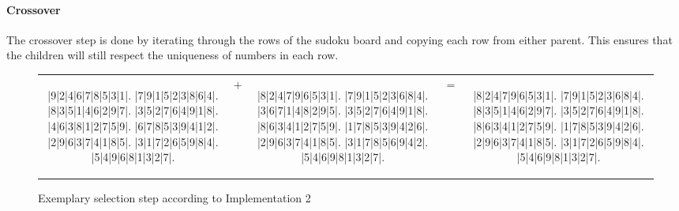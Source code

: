 \paragraph{Crossover} The crossover step is done by iterating through the rows of the sudoku board and copying each row from either parent. This ensures that the children will still respect the uniqueness of numbers in each row.

\begin{figure}[H]
  \centering
  {\setlength{\tabcolsep}{-9pt}
  \renewcommand{\arraystretch}{1.5}
   \begin{tabular}{c c c c c}
    \begin{adjustbox}{width=0.38\textwidth,valign=c}
      \begin{minipage}{\linewidth}
        \begin{sudoku}
          |9|2|4|6|7|8|5|3|1|.
          |7|9|1|5|2|3|8|6|4|.
          |8|3|5|1|4|6|2|9|7|.
          |3|5|2|7|6|4|9|1|8|.
          |4|6|3|8|1|2|7|5|9|.
          |6|7|8|5|3|9|4|1|2|.
          |2|9|6|3|7|4|1|8|5|.
          |3|1|7|2|6|5|9|8|4|.
          |5|4|9|6|8|1|3|2|7|.
        \end{sudoku}
      \end{minipage}
    \end{adjustbox}
    & %
    {\begin{adjustbox}{valign=c}\Large$+$\end{adjustbox}}
    &
    \begin{adjustbox}{width=0.38\textwidth,valign=c}
      \begin{minipage}{\linewidth}
        \begin{sudoku}
          |8|2|4|7|9|6|5|3|1|.
          |7|9|1|5|2|3|6|8|4|.
          |3|6|7|1|4|8|2|9|5|.
          |3|5|2|7|6|4|9|1|8|.
          |8|6|3|4|1|2|7|5|9|.
          |1|7|8|5|3|9|4|2|6|.
          |2|9|6|3|7|4|1|8|5|.
          |3|1|7|8|5|6|9|4|2|.
          |5|4|6|9|8|1|3|2|7|.
        \end{sudoku}
      \end{minipage}
    \end{adjustbox}
    & %
    {\begin{adjustbox}{valign=c}\Large$=$\end{adjustbox}}
    &
    \begin{adjustbox}{width=0.38\textwidth,valign=c}
      \begin{minipage}{\linewidth}
        \begin{sudoku}
          |8|2|4|7|9|6|5|3|1|.
          |7|9|1|5|2|3|6|8|4|.
          |8|3|5|1|4|6|2|9|7|.
          |3|5|2|7|6|4|9|1|8|.
          |8|6|3|4|1|2|7|5|9|.
          |1|7|8|5|3|9|4|2|6|.
          |2|9|6|3|7|4|1|8|5|.
          |3|1|7|2|6|5|9|8|4|.
          |5|4|6|9|8|1|3|2|7|.
        \end{sudoku}
      \end{minipage}
    \end{adjustbox}
   \end{tabular}
  }
  \caption{Exemplary selection step according to Implementation 2}
  \label{fig:impl-2-selection}
\end{figure}

